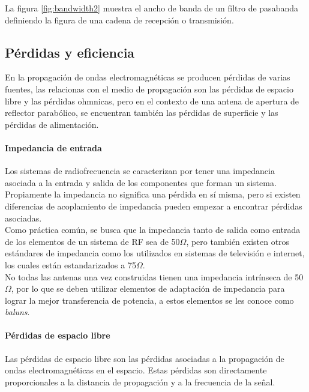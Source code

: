 La figura \ref{fig:bandwidth2} muestra el ancho de banda de un filtro de pasabanda definiendo la figura de una cadena de recepción o transmisión.\\


\subsection{Pérdidas y eficiencia}

En la propagación de ondas electromagnéticas se producen pérdidas de varias fuentes, las relacionas con el medio de propagación son las pérdidas de espacio libre y las pérdidas ohmnicas, pero en el contexto de una antena de apertura de reflector parabólico, se encuentran también las pérdidas de superficie y las pérdidas de alimentación.\\

\paragraph{Impedancia de entrada}

Los sistemas de radiofrecuencia se caracterizan por tener una impedancia asociada a la entrada y salida de los componentes que forman un sistema. Propiamente la impedancia no significa una pérdida en sí misma, pero si existen diferencias de acoplamiento de impedancia pueden empezar a encontrar pérdidas asociadas.\\

Como práctica común, se busca que la impedancia tanto de salida como entrada de los elementos de un sistema de RF sea de 50$\Omega$, pero también existen otros estándares de impedancia como los utilizados en sistemas de televisión e internet, los cuales están estandarizados a 75$\Omega$.\\

No todas las antenas una vez construidas tienen una impedancia intrínseca de 50$\Omega$, por lo que se deben utilizar elementos de adaptación de impedancia para lograr la mejor transferencia de potencia, a estos elementos se les conoce como \textit{baluns}.\\

\paragraph{Pérdidas de espacio libre}

Las pérdidas de espacio libre son las pérdidas asociadas a la propagación de ondas electromagnéticas en el espacio. Estas pérdidas son directamente proporcionales a la distancia de propagación y a la frecuencia de la señal.\\

